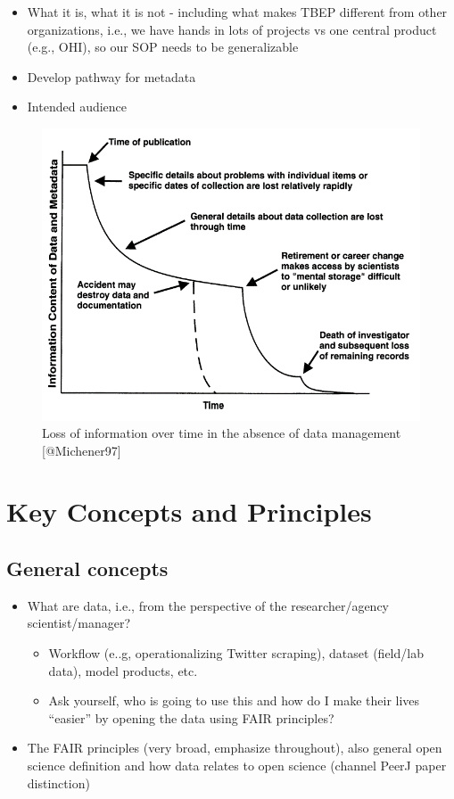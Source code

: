\documentclass[
]{book}
\providecommand{\tightlist}{%
  \setlength{\itemsep}{0pt}\setlength{\parskip}{0pt}}
\begin{document}
\begin{itemize}
\tightlist
\item
  What it is, what it is not - including what makes TBEP different from other organizations, i.e., we have hands in lots of projects vs one central product (e.g., OHI), so our SOP needs to be generalizable
\item
  Develop pathway for metadata
\item
  Intended audience
\end{itemize}

\begin{figure}
\includegraphics[width=10.19in]{img/michener} \caption{Loss of information over time in the absence of data management [@Michener97]}\label{fig:michener}
\end{figure}

\hypertarget{keys}{%
\chapter{Key Concepts and Principles}\label{keys}}

\hypertarget{general-concepts}{%
\section{General concepts}\label{general-concepts}}

\begin{itemize}
\tightlist
\item
  What are data, i.e., from the perspective of the researcher/agency scientist/manager?

  \begin{itemize}
  \tightlist
  \item
    Workflow (e..g, operationalizing Twitter scraping), dataset (field/lab data), model products, etc.
  \item
    Ask yourself, who is going to use this and how do I make their lives ``easier'' by opening the data using FAIR principles?
  \end{itemize}
\item
  The FAIR principles (very broad, emphasize throughout), also general open science definition and how data relates to open science (channel PeerJ paper distinction)
\end{itemize}
\end{document}
